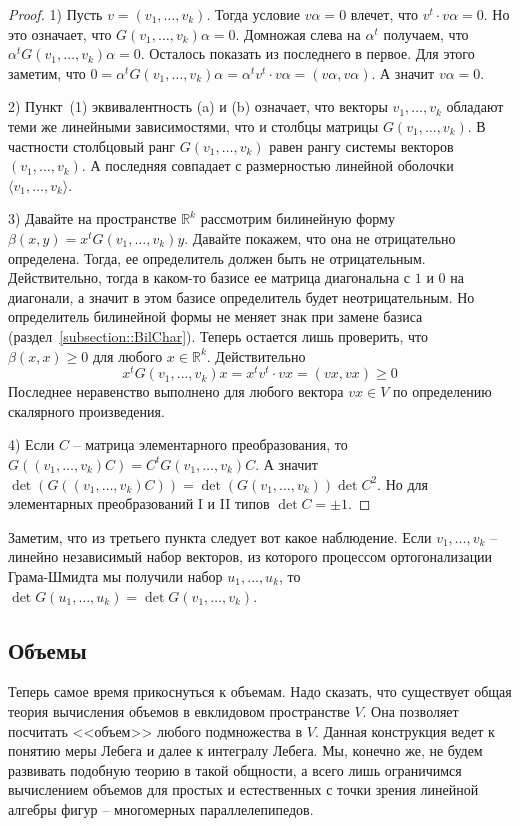 \begin{proof}
1) Пусть $v = (v_1,\ldots,v_k)$.
Тогда условие $v\alpha = 0$ влечет, что $v^t \cdot v\alpha = 0$.
Но это означает, что $G(v_1,\ldots,v_k) \alpha = 0$.
Домножая слева на $\alpha^t$ получаем, что $\alpha^t G(v_1,\ldots,v_k) \alpha = 0$.
Осталось показать из последнего в первое.
Для этого заметим, что $0 = \alpha^t G(v_1,\ldots,v_k) \alpha = \alpha^t v^t \cdot v\alpha = (v\alpha, v\alpha)$.
А значит $v\alpha = 0$.

2) Пункт~(1) эквивалентность (a) и (b) означает, что векторы $v_1,\ldots,v_k$ обладают теми же линейными зависимостями, что и столбцы матрицы $G(v_1,\ldots,v_k)$.
В частности столбцовый ранг $G(v_1,\ldots,v_k)$ равен рангу системы векторов $(v_1,\ldots,v_k)$.
А последняя совпадает с размерностью линейной оболочки $\langle v_1,\ldots,v_k\rangle$.

3) Давайте на пространстве $\mathbb R^k$ рассмотрим билинейную форму $\beta(x,y) = x^t G(v_1,\ldots,v_k)y$.
Давайте покажем, что она не отрицательно определена.
Тогда, ее определитель должен быть не отрицательным.
Действительно, тогда в каком-то базисе ее матрица диагональна с $1$ и $0$ на диагонали, а значит в этом базисе определитель будет неотрицательным.
Но определитель билинейной формы не меняет знак при замене базиса (раздел~\ref{subsection::BilChar}).
Теперь остается лишь проверить, что $\beta(x,x)\geqslant 0$ для любого $x\in \mathbb R^k$.
Действительно
\[
x^t G(v_1,\ldots,v_k) x = x^t v^t\cdot v x = (vx, vx) \geqslant 0
\]
Последнее неравенство выполнено для любого вектора $vx\in V$ по определению скалярного произведения.

4) Если $C$ -- матрица элементарного преобразования, то $G((v_1,\ldots,v_k)C) = C^t G(v_1,\ldots,v_k)C$.
А значит $\det(G((v_1,\ldots,v_k)C)) = \det(G(v_1,\ldots,v_k))\det C^2$.
Но для элементарных преобразований I и II типов $\det C = \pm 1$.
\end{proof}

Заметим, что из третьего пункта следует вот какое наблюдение.
Если $v_1,\ldots, v_k$ -- линейно независимый набор векторов, из которого процессом ортогонализации Грама-Шмидта мы получили набор $u_1,\ldots,u_k$, то $\det G(u_1,\ldots,u_k) = \det G(v_1,\ldots,v_k)$.

\subsection{Объемы}

Теперь самое время прикоснуться к объемам.
Надо сказать, что существует общая теория вычисления объемов в евклидовом пространстве $V$.
Она позволяет посчитать <<объем>> любого подмножества в $V$.
Данная конструкция ведет к понятию меры Лебега и далее к интегралу Лебега.
Мы, конечно же, не будем развивать подобную теорию в такой общности, а всего лишь ограничимся вычислением объемов для простых и естественных с точки зрения линейной алгебры фигур -- многомерных параллелепипедов.

